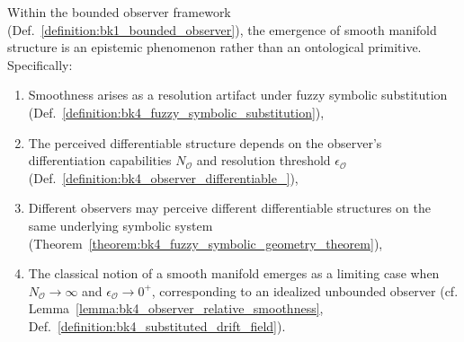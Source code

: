 \begin{corollary}
\label{corollary:bk4_smoothness_as_epistemic_phenomenon}

Within the bounded observer framework (Def.~\ref{definition:bk1_bounded_observer}), the emergence of smooth manifold structure is an epistemic phenomenon rather than an ontological primitive. Specifically:

\begin{enumerate}
    \item Smoothness arises as a resolution artifact under fuzzy symbolic substitution (Def.~\ref{definition:bk4_fuzzy_symbolic_substitution}),
    \item The perceived differentiable structure depends on the observer's differentiation capabilities $N_\mathcal{O}$ and resolution threshold $\epsilon_\mathcal{O}$ (Def.~\ref{definition:bk4_observer_differentiable_}),
    \item Different observers may perceive different differentiable structures on the same underlying symbolic system (Theorem~\ref{theorem:bk4_fuzzy_symbolic_geometry_theorem}),
    \item The classical notion of a smooth manifold emerges as a limiting case when $N_\mathcal{O} \to \infty$ and $\epsilon_\mathcal{O} \to 0^+$, corresponding to an idealized unbounded observer (cf. Lemma~\ref{lemma:bk4_observer_relative_smoothness}, Def.~\ref{definition:bk4_substituted_drift_field}).
\end{enumerate}
\end{corollary}
